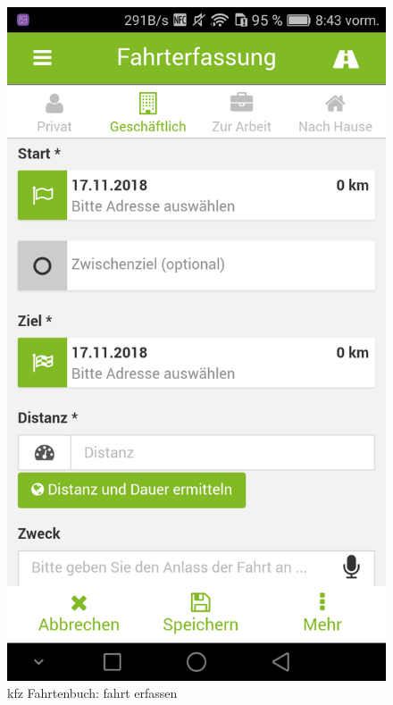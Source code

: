 \begin{figure}[H]%
    \begin{minipage}[b]{.4\linewidth} %
        \includegraphics[scale=0.14]{img/kfz3}
        \caption{\label{img:img/kfz3}kfz Fahrtenbuch: fahrt erfassen}
    \end{minipage}
    \hspace{0.1\linewidth}%
    \begin{minipage}[b]{.4\linewidth} %

\end{minipage}
\end{figure}
